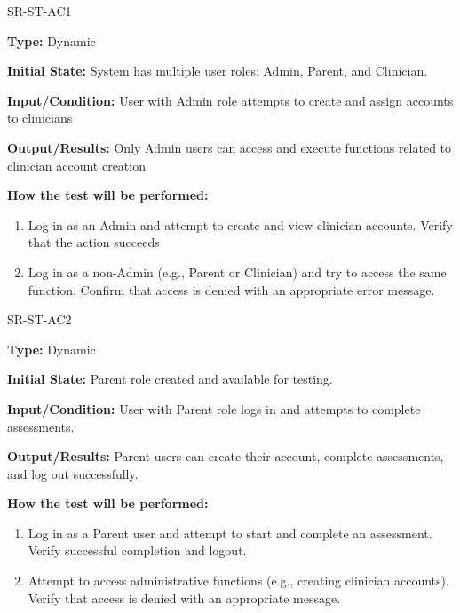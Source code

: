 \documentclass[12pt, titlepage]{article}
\begin{document}
\begin{itemize}
  \begin{item}
      SR-ST-AC1
      \begin{mdframed}[linewidth=0.5mm]
          \textbf{Type:} Dynamic \par
          \textbf{Initial State:} System has multiple user roles: Admin, Parent, and Clinician. \par
          \textbf{Input/Condition:}   User with Admin role attempts to create and assign accounts to clinicians \par
          \textbf{Output/Results:}  Only Admin users can access and execute functions related 
          to clinician account creation \par
          \textbf{How the test will be performed:}
          \begin{enumerate}[noitemsep]
            \item Log in as an Admin and attempt to create and view clinician accounts. Verify that the action succeeds
            \item Log in as a non-Admin (e.g., Parent or Clinician) and try to access the same 
            function. Confirm that access is denied with an appropriate error message.
          \end{enumerate}
      \end{mdframed}
  \end{item}

  \begin{item}
    SR-ST-AC2
    \begin{mdframed}[linewidth=0.5mm]
      \textbf{Type:} Dynamic \par
      \textbf{Initial State:} Parent role created and available for testing. \par
      \textbf{Input/Condition:} User with Parent role logs in and attempts to complete assessments. \par
      \textbf{Output/Results:} Parent users can create their account, complete assessments, and log out successfully. \par
      \textbf{How the test will be performed:}
      \begin{enumerate}[noitemsep]
        \item Log in as a Parent user and attempt to start and complete an assessment. Verify successful completion and logout.
        \item Attempt to access administrative functions (e.g., creating clinician accounts). 
        Verify that access is denied with an appropriate message.
      \end{enumerate}
    \end{mdframed}
  \end{item}
  

\end{itemize}
\end{document}
